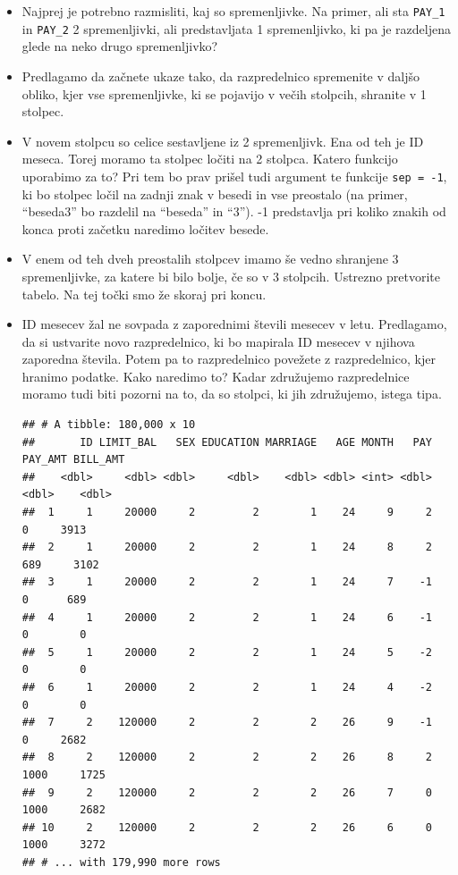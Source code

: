 \documentclass[
]{book}
\begin{document}
\begin{itemize}
\item
  Najprej je potrebno razmisliti, kaj so spremenljivke. Na primer, ali sta \texttt{PAY\_1} in \texttt{PAY\_2} 2 spremenljivki, ali predstavljata 1 spremenljivko, ki pa je razdeljena glede na neko drugo spremenljivko?
\item
  Predlagamo da začnete ukaze tako, da razpredelnico spremenite v daljšo obliko, kjer vse spremenljivke, ki se pojavijo v večih stolpcih, shranite v 1 stolpec.
\item
  V novem stolpcu so celice sestavljene iz 2 spremenljivk. Ena od teh je ID meseca. Torej moramo ta stolpec ločiti na 2 stolpca. Katero funkcijo uporabimo za to? Pri tem bo prav prišel tudi argument te funkcije \texttt{sep\ =\ -1}, ki bo stolpec ločil na zadnji znak v besedi in vse preostalo (na primer, ``beseda3'' bo razdelil na ``beseda'' in ``3''). -1 predstavlja pri koliko znakih od konca proti začetku naredimo ločitev besede.
\item
  V enem od teh dveh preostalih stolpcev imamo še vedno shranjene 3 spremenljivke, za katere bi bilo bolje, če so v 3 stolpcih. Ustrezno pretvorite tabelo. Na tej točki smo že skoraj pri koncu.
\item
  ID mesecev žal ne sovpada z zaporednimi števili mesecev v letu. Predlagamo, da si ustvarite novo razpredelnico, ki bo mapirala ID mesecev v njihova zaporedna števila. Potem pa to razpredelnico povežete z razpredelnico, kjer hranimo podatke. Kako naredimo to? Kadar združujemo razpredelnice moramo tudi biti pozorni na to, da so stolpci, ki jih združujemo, istega tipa.

\begin{verbatim}
## # A tibble: 180,000 x 10
##       ID LIMIT_BAL   SEX EDUCATION MARRIAGE   AGE MONTH   PAY PAY_AMT BILL_AMT
##    <dbl>     <dbl> <dbl>     <dbl>    <dbl> <dbl> <int> <dbl>   <dbl>    <dbl>
##  1     1     20000     2         2        1    24     9     2       0     3913
##  2     1     20000     2         2        1    24     8     2     689     3102
##  3     1     20000     2         2        1    24     7    -1       0      689
##  4     1     20000     2         2        1    24     6    -1       0        0
##  5     1     20000     2         2        1    24     5    -2       0        0
##  6     1     20000     2         2        1    24     4    -2       0        0
##  7     2    120000     2         2        2    26     9    -1       0     2682
##  8     2    120000     2         2        2    26     8     2    1000     1725
##  9     2    120000     2         2        2    26     7     0    1000     2682
## 10     2    120000     2         2        2    26     6     0    1000     3272
## # ... with 179,990 more rows
\end{verbatim}
\end{itemize}
\end{document}

